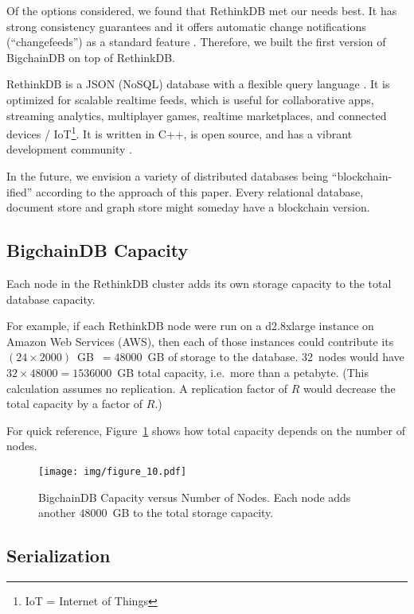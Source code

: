 Of the options considered, we found that RethinkDB met our needs best.
It has strong consistency guarantees \cite{rethinkdb_consistency} and it offers automatic change notifications (“changefeeds”) as a standard feature \cite{rethinkdb_changefeeds}.
Therefore, we built the first version of BigchainDB on top of RethinkDB.

RethinkDB is a JSON (NoSQL) database with a flexible query language \cite{rethinkdb_faq}.
It is optimized for scalable realtime feeds, which is useful for collaborative apps, streaming analytics, multiplayer games, realtime marketplaces, and connected devices / IoT\footnote{IoT = Internet of Things}.
It is written in C++, is open source, and has a vibrant development community \cite{rethinkdb_github}.

In the future, we envision a variety of distributed databases being “blockchain-ified” according to the approach of this paper.
Every relational database, document store and graph store might someday have a blockchain version.


\subsection{BigchainDB Capacity}

Each node in the RethinkDB cluster adds its own storage capacity to the total database capacity.

For example, if each RethinkDB node were run on a d2.8xlarge instance on Amazon Web Services (AWS), then each of those instances could contribute its $(24 \times 2000)$~GB~$= 48000$~GB of storage to the database. 32~nodes would have $32 \times 48000 = 1536000$~GB total capacity, i.e.~more than a petabyte. (This calculation assumes no replication. A replication factor of $R$ would decrease the total capacity by a factor of $R$.)

For quick reference, Figure~\ref{fig:bigchain_capacity_vs_nodes} shows how total capacity depends on the number of nodes. 

\begin{figure}[!ht]
  \centering
  \texttt{[image: img/figure\_10.pdf]}
  \caption{BigchainDB Capacity versus Number of Nodes. Each node adds another $48000$~GB to the total storage capacity.}
  \label{fig:bigchain_capacity_vs_nodes}
\end{figure}


\subsection{Serialization}

